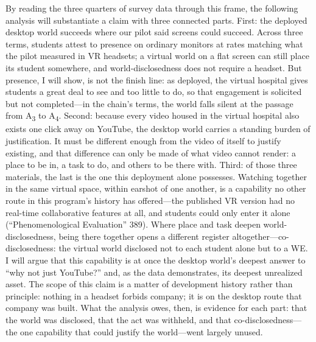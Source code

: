 
By reading the three quarters of survey data through this frame, the following
analysis will substantiate a claim with three connected parts.
First: the deployed desktop world succeeds where our pilot said screens could
succeed. Across three terms, students attest to presence on ordinary monitors at
rates matching what the pilot measured in VR headsets; a virtual world on a flat
screen can still place its student somewhere, and world-disclosedness does not
require a headset. But presence, I will show, is not the finish line: as
deployed, the virtual hospital gives students a great deal to see and too little
to do, so that engagement is solicited but not completed---in the chain's terms,
the world falls silent at the passage from A\textsubscript{3} to
A\textsubscript{4}. Second:
because every video housed in the virtual hospital also exists one click away on
YouTube, the desktop world carries a standing burden of justification. It must
be different enough from the video of itself to justify existing, and that
difference can only be made of what video cannot render: a place to be in, a
task to do, and others to be there with. Third: of those three materials, the
last is the one this deployment alone possesses. Watching together in the same
virtual space, within earshot of one another, is a capability no other route in
this program's history has offered---the published VR version had no real-time
collaborative features at all, and students could only enter it alone
(``Phenomenological Evaluation'' 389). Where place and task deepen
world-disclosedness, being there together opens a different register
altogether---co-disclosedness: the virtual world disclosed not to each student
alone but to a WE. I will argue that this capability is at once the desktop
world's deepest answer to ``why not just YouTube?'' and, as the data
demonstrates, its deepest unrealized asset. The scope of this claim is a matter
of development history rather than principle: nothing in a headset forbids
company; it is on the desktop route that company was built. What the analysis
owes, then, is evidence for each part: that the world was disclosed, that
the act was withheld, and that co-disclosedness---the one capability that could
justify the world---went largely unused.

